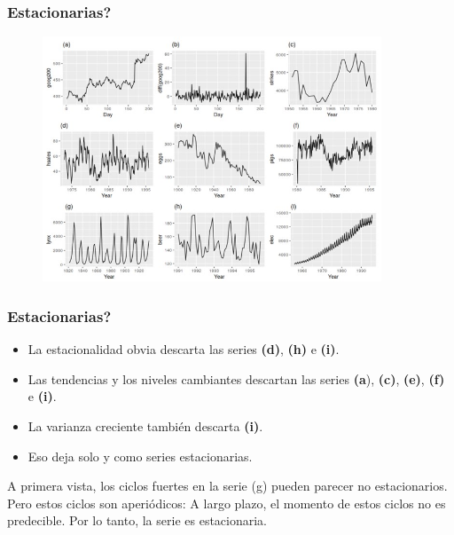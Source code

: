 \documentclass[10pt]{beamer}
\begin{document}





\begin{frame}
\frametitle{Estacionarias?}



\begin{figure}
\begin{center}
    \includegraphics[width=0.9\textwidth]{Imagen1.JPG}
\end{center}
\end{figure}



\end{frame}






\begin{frame}
\frametitle{Estacionarias?}


\begin{itemize}
\item La estacionalidad obvia descarta las series \textbf{(d)}, \textbf{(h)} e \textbf{(i)}. 
\item Las tendencias y los niveles cambiantes descartan las series \textbf{(a}), \textbf{(c)}, \textbf{(e)}, \textbf{(f)} e \textbf{(i)}. 
\item La varianza creciente también descarta \textbf{(i)}. 
\item Eso deja solo  y  como series estacionarias.
\end{itemize}

\vspace{4mm}

A primera vista, los ciclos fuertes en la serie (g) pueden parecer no estacionarios. Pero estos ciclos son aperiódicos: A largo plazo, el momento de estos ciclos no es predecible. Por lo tanto, la serie es estacionaria.

\end{frame}
\end{document}
